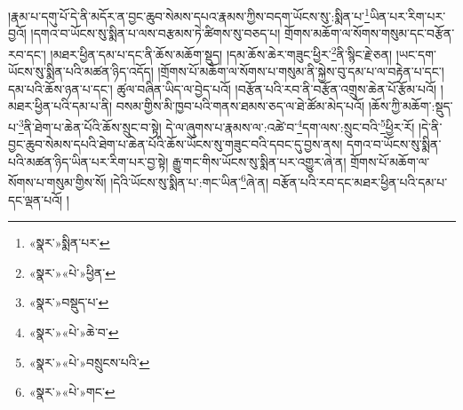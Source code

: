 །རྣམ་པ་དགུ་པོ་དེ་ནི་མདོར་ན་བྱང་ཆུབ་སེམས་དཔའ་རྣམས་ཀྱིས་བདག་ཡོངས་སུ་:སྨིན་པ་\footnote{«སྣར་»སྨིན་པར་}ཡིན་པར་རིག་པར་བྱའོ། །དགའ་བ་ཡོངས་སུ་སྨིན་པ་ལས་བརྩམས་ཏེ་ཚིགས་སུ་བཅད་པ། གྲོགས་མཆོག་ལ་སོགས་གསུམ་དང་བརྩོན་རབ་དང་། །མཐར་ཕྱིན་དམ་པ་དང་ནི་ཆོས་མཆོག་སྡུད། །དམ་ཆོས་ཆེར་གཟུང་ཕྱིར་\footnote{«སྣར་»«པེ་»ཕྱིན་}ནི་སྙིང་རྗེ་ཅན། །ཡང་དག་ཡོངས་སུ་སྨིན་པའི་མཚན་ཉིད་འདོད། །གྲོགས་པོ་མཆོག་ལ་སོགས་པ་གསུམ་ནི་སྐྱེས་བུ་དམ་པ་ལ་བརྟེན་པ་དང་། དམ་པའི་ཆོས་ཉན་པ་དང་། ཚུལ་བཞིན་ཡིད་ལ་བྱེད་པའོ། །བརྩོན་པའི་རབ་ནི་བརྩོན་འགྲུས་ཆེན་པོ་རྩོམ་པའོ། །མཐར་ཕྱིན་པའི་དམ་པ་ནི། བསམ་གྱིས་མི་ཁྱབ་པའི་གནས་ཐམས་ཅད་ལ་ཐེ་ཚོམ་མེད་པའོ། །ཆོས་ཀྱི་མཆོག་:སྡུད་པ་\footnote{«སྣར་»བསྡུད་པ་}ནི་ཐེག་པ་ཆེན་པོའི་ཆོས་སྲུང་བ་སྟེ། དེ་ལ་ཞུགས་པ་རྣམས་ལ་:འཚེ་བ་\footnote{«སྣར་»«པེ་»ཆེ་བ་}དག་ལས་:སྲུང་བའི་\footnote{«སྣར་»«པེ་»བསྲུངས་པའི་}ཕྱིར་རོ། །དེ་ནི་བྱང་ཆུབ་སེམས་དཔའི་ཐེག་པ་ཆེན་པོའི་ཆོས་ཡོངས་སུ་གཟུང་བའི་དབང་དུ་བྱས་ནས། དགའ་བ་ཡོངས་སུ་སྨིན་པའི་མཚན་ཉིད་ཡིན་པར་རིག་པར་བྱ་སྟེ། རྒྱུ་གང་གིས་ཡོངས་སུ་སྨིན་པར་འགྱུར་ཞེ་ན། གྲོགས་པོ་མཆོག་ལ་སོགས་པ་གསུམ་གྱིས་སོ། །དེའི་ཡོངས་སུ་སྨིན་པ་:གང་ཡིན་\footnote{«སྣར་»«པེ་»གང་}ཞེ་ན། བརྩོན་པའི་རབ་དང་མཐར་ཕྱིན་པའི་དམ་པ་དང་ལྡན་པའོ། །
